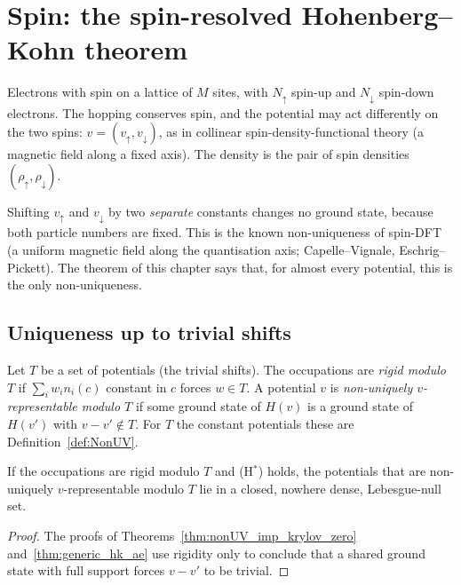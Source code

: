 \chapter{Spin: the spin-resolved Hohenberg--Kohn theorem}
\label{chap:spin}

Electrons with spin on a lattice of $M$ sites, with $N_\uparrow$ spin-up and $N_\downarrow$ spin-down
electrons. The hopping conserves spin, and the potential may act differently on the two spins:
$v=(v_\uparrow,v_\downarrow)$, as in collinear spin-density-functional theory (a magnetic field along a
fixed axis). The density is the pair of spin densities $(\rho_\uparrow,\rho_\downarrow)$.

Shifting $v_\uparrow$ and $v_\downarrow$ by two \emph{separate} constants changes no ground state, because
both particle numbers are fixed. This is the known non-uniqueness of spin-DFT (a uniform magnetic field
along the quantisation axis; Capelle--Vignale, Eschrig--Pickett). The theorem of this chapter says that,
for almost every potential, this is the only non-uniqueness.

\section{Uniqueness up to trivial shifts}

\begin{definition}
  \label{def:RigidMod}
  \leanok
  Let $T$ be a set of potentials (the trivial shifts). The occupations are \emph{rigid modulo $T$} if
  $\sum_iw_in_i(c)$ constant in $c$ forces $w\in T$. A potential $v$ is \emph{non-uniquely
  $v$-representable modulo $T$} if some ground state of $H(v)$ is a ground state of $H(v')$ with
  $v-v'\notin T$. For $T$ the constant potentials these are Definition~\ref{def:NonUV}.
\end{definition}

\begin{theorem}
  \label{thm:generic_hk_ae_mod}
  \leanok
  If the occupations are rigid modulo $T$ and (H$^*$) holds, the potentials that are non-uniquely
  $v$-representable modulo $T$ lie in a closed, nowhere dense, Lebesgue-null set.
\end{theorem}
\begin{proof}
  \leanok
  The proofs of Theorems~\ref{thm:nonUV_imp_krylov_zero} and~\ref{thm:generic_hk_ae} use rigidity only to
  conclude that a shared ground state with full support forces $v-v'$ to be trivial.
\end{proof}

